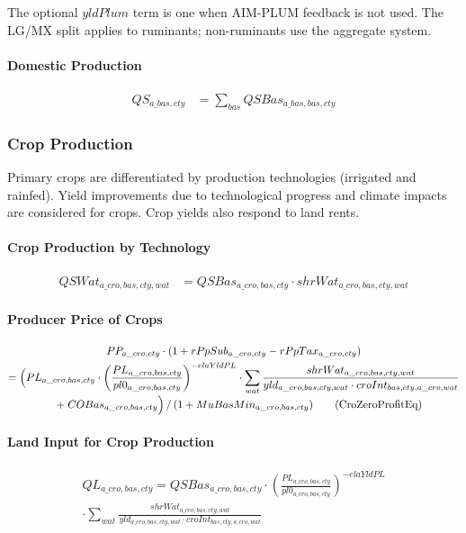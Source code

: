 The optional \(yldPlum\) term is one when AIM-PLUM feedback is not used. The LG/MX split applies to ruminants; non-ruminants use the aggregate system.

\paragraph{Domestic Production}
\begin{align}
  QS_{a\_bas,cty}
  &= \sum_{bas} QSBas_{a\_bas,bas,cty}
  \tag{QSAggEq}\label{eq:QSAggEq}
\end{align}

\subsubsection{Crop Production}

Primary crops are differentiated by production technologies (irrigated and rainfed).
Yield improvements due to technological progress and climate impacts are considered for crops. Crop yields also respond to land rents.

\paragraph{Crop Production by Technology}
\begin{align}
  QSWat_{a\_cro,bas,cty,wat}
  &= QSBas_{a\_cro,bas,cty} \cdot shrWat_{a\_cro,bas,cty,wat}
  \tag{QSWatEq}\label{eq:QSWatEq}
\end{align}

\paragraph{Producer Price of Crops}
\begin{multline}
  PP_{a\_cro,cty}\cdot(1+rPpSub_{a\_cro,cty}-rPpTax_{a\_cro,cty}) \\
  = \Bigl(
      PL_{a\_cro,bas,cty}
      \cdot
      \left(\frac{PL_{a\_cro,bas,cty}}{pl0_{a\_cro,bas,cty}}\right)^{-elaYldPL}
      \cdot
      \sum_{wat}
      \frac{
        shrWat_{a\_cro,bas,cty,wat}
      }{
        yld_{a\_cro,bas,cty,wat}
        \cdot
        croInt_{bas,cty,a\_cro,wat}
      }
      \\[-0.3em]
  \quad
      +\; COBas_{a\_cro,bas,cty}
     \Bigl)
     \,/\, (1 + MuBasMin_{a\_cro,bas,cty})
  \tag{CroZeroProfitEq}\label{eq:CroZeroProfitEq}
\end{multline}

\paragraph{Land Input for Crop Production}
\begin{multline}
  QL_{a\_cro,bas,cty}
  = QSBas_{a\_cro,bas,cty}
     \cdot
     \left(\frac{PL_{a\_cro,bas,cty}}{pl0_{a\_cro,bas,cty}}\right)^{-elaYldPL}
     \\[-0.3em]
     \cdot
     \sum_{wat}
     \frac{
       shrWat_{a\_cro,bas,cty,wat}
     }{
       yld_{a\_cro,bas,cty,wat}
       \cdot
       croInt_{bas,cty,a\_cro,wat}
     }
  \tag{CroLandEq}\label{eq:CroLandEq}
\end{multline}

